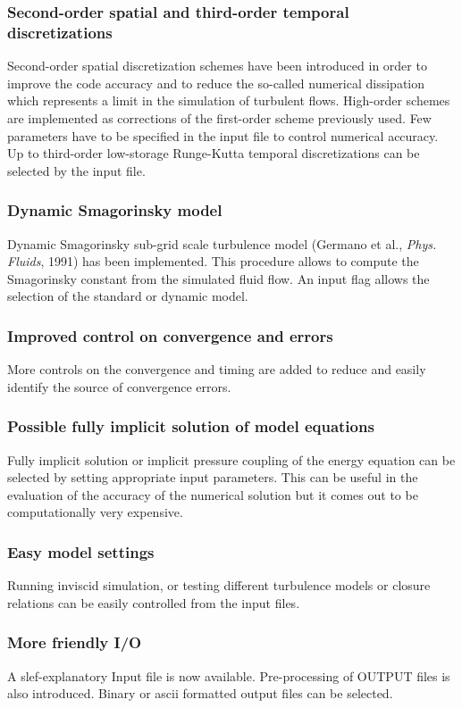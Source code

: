 \subsubsection*{Second-order spatial and third-order temporal discretizations}
Second-order spatial discretization schemes have been introduced in order
to improve the code accuracy and to reduce the so-called numerical 
dissipation which represents a limit in the simulation of turbulent flows.
High-order schemes are implemented as corrections of the first-order
scheme previously used. Few parameters have to be specified in the input
file to control numerical accuracy. Up to third-order low-storage 
Runge-Kutta temporal discretizations can be selected by the input file.

\subsubsection*{Dynamic Smagorinsky model}
Dynamic Smagorinsky sub-grid scale turbulence model 
(Germano et al., {\it Phys. Fluids}, 1991) has been implemented. This 
procedure allows to compute the Smagorinsky constant from the simulated
fluid flow. An input flag allows the selection of the standard or dynamic model.

\subsubsection*{Improved control on convergence and errors}
More controls on the convergence and timing are added to reduce and
easily identify the source of convergence errors.

\subsubsection*{Possible fully implicit solution of model equations}
Fully implicit solution or implicit pressure coupling of the energy
equation can be selected by setting appropriate input parameters. This can
be useful in the evaluation of the accuracy of the numerical solution
but it comes out to be computationally very expensive.

\subsubsection*{Easy model settings}
Running inviscid simulation, or testing different turbulence models or closure 
relations can be easily controlled from the input files.

\subsubsection*{More friendly I/O}
A slef-explanatory Input file is now available. Pre-processing of OUTPUT files
is also introduced. Binary or ascii formatted output files can be selected.

